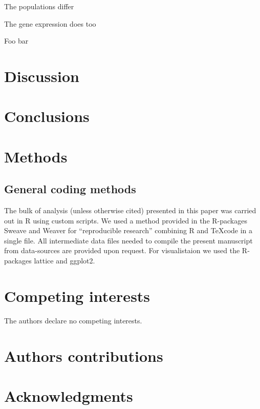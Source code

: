 \documentclass[10pt]{bmc_article}
\newenvironment{bmcformat}{\begin{raggedright}\baselineskip20pt\sloppy\setboolean{publ}{false}}{\end{raggedright}\baselineskip20pt\sloppy}
\begin{document}
\begin{bmcformat}
The populations differ


The gene expression does too


Foo bar



\section*{Discussion}


\section*{Conclusions}

  
\section*{Methods}

\subsection*{General coding methods}

The bulk of analysis (unless otherwise cited) presented in this paper
was carried out in R \cite{R_project} using custom scripts. We used a
method provided in the R-packages
Sweave\cite{lmucs-papers:Leisch:2002} and Weaver\cite{weaver} for
``reproducible research'' combining R and \TeX code in a single
file. All intermediate data files needed to compile the present
manuscript from data-sources are provided upon request. For
visualistaion we used the R-packages lattice\cite{lattice-book} and
ggplot2\cite{ggplot-book}.


\section*{Competing interests}
The authors declare no competing interests.

\section*{Authors contributions}

\section*{Acknowledgments}


\end{bmcformat}
\end{document}
